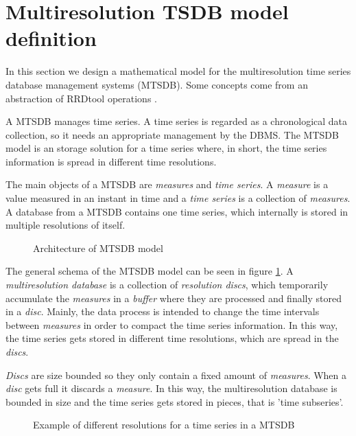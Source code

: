 \section{Multiresolution TSDB model definition}

In this section we design a mathematical model for the multiresolution time series database management systems (MTSDB). Some concepts come from an abstraction of RRDtool operations \parencite{rrdtool}. 

A MTSDB manages time series. A time series is regarded as a chronological data collection, so it needs an appropriate management by the DBMS.
The MTSDB model is an storage solution for a time series where, in short,  the time series information is spread in different time resolutions. 

The main objects of a MTSDB are \emph{measures} and \emph{time series}. A \emph{measure} is a value measured in an instant in time and a  \emph{time series} is a collection of \emph{measures}. A database from a MTSDB contains one time series, which internally is stored in multiple resolutions of itself.

\begin{figure}[tp]
\centering
\setlength{\unitlength}{0.4mm}

\caption{Architecture of MTSDB model}
\label{fig:model:mtsdb}
\end{figure}

The general schema of the MTSDB model can be seen in figure \ref{fig:model:mtsdb}.  A \emph{multiresolution database} is a collection of \emph{resolution discs}, which temporarily accumulate the \emph{measures} in a \emph{buffer} where they are processed and finally stored in a \emph{disc}. Mainly, the data process is intended to change the time intervals between \emph{measures} in order to compact the time series information. In this way, the time series gets stored in different time resolutions, which are spread in the \emph{discs}.

\emph{Discs} are size bounded so they only contain a fixed amount of \emph{measures}. When a \emph{disc} gets full it discards a \emph{measure}. In this way, the multiresolution database is bounded in size and the time series gets stored in pieces, that is 'time subseries'.



\begin{figure}[tp]
\centering

\caption{Example of different resolutions for a time series in a MTSDB}
\label{fig:model:window}
\end{figure}

